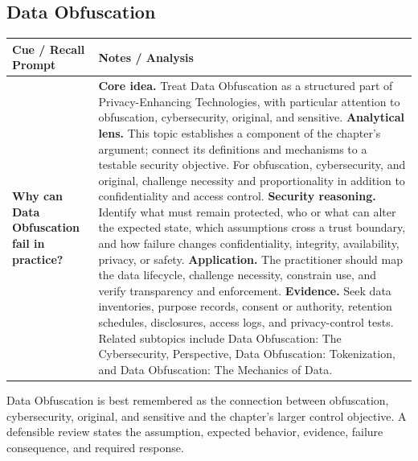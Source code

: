 \documentclass[11pt]{article}
\newcommand{\CornellHeader}{%
\rowcolor{Navy}\color{white}\bfseries Cue / Recall Prompt & \color{white}\bfseries Notes / Analysis\\\hline}
\newcommand{\CornellRow}[2]{%
\cellcolor{CueGray}\RaggedRight\textbf{#1} & \RaggedRight #2\\\hline}
\begin{document}
\subsection*{Data Obfuscation}
\begin{longtable}{>{\RaggedRight\arraybackslash}p{}|>{\RaggedRight\arraybackslash}p{}}
\CornellHeader
\CornellRow{Why can Data Obfuscation fail in practice?}{\textbf{Core idea.} Treat Data Obfuscation as a structured part of Privacy-Enhancing Technologies, with particular attention to obfuscation, cybersecurity, original, and sensitive. \textbf{Analytical lens.} This topic establishes a component of the chapter's argument; connect its definitions and mechanisms to a testable security objective. For obfuscation, cybersecurity, and original, challenge necessity and proportionality in addition to confidentiality and access control. \textbf{Security reasoning.} Identify what must remain protected, who or what can alter the expected state, which assumptions cross a trust boundary, and how failure changes confidentiality, integrity, availability, privacy, or safety. \textbf{Application.} The practitioner should map the data lifecycle, challenge necessity, constrain use, and verify transparency and enforcement. \textbf{Evidence.} Seek data inventories, purpose records, consent or authority, retention schedules, disclosures, access logs, and privacy-control tests. Related subtopics include Data Obfuscation: The Cybersecurity, Perspective, Data Obfuscation: Tokenization, and Data Obfuscation: The Mechanics of Data.}
\end{longtable}
\begin{topicsummary}
Data Obfuscation is best remembered as the connection between obfuscation, cybersecurity, original, and sensitive and the chapter's larger control objective. A defensible review states the assumption, expected behavior, evidence, failure consequence, and required response.
\end{topicsummary}
\end{document}
